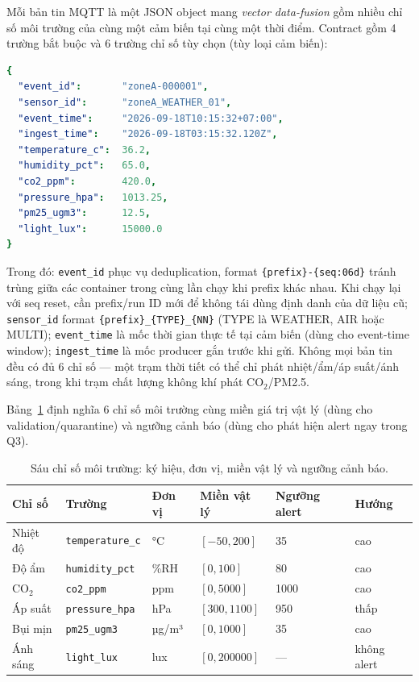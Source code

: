 Mỗi bản tin MQTT là một JSON object mang \emph{vector data-fusion} gồm nhiều
chỉ số môi trường của cùng một cảm biến tại cùng một thời điểm. Contract gồm
4 trường bắt buộc và 6 trường chỉ số tùy chọn (tùy loại cảm biến):

\begin{lstlisting}[language=yaml,basicstyle=\ttfamily\footnotesize,frame=single,
  caption={Sensor event schema (JSON) voi vector da chi so.},label={lst:schema}]
{
  "event_id":       "zoneA-000001",
  "sensor_id":      "zoneA_WEATHER_01",
  "event_time":     "2026-09-18T10:15:32+07:00",
  "ingest_time":    "2026-09-18T03:15:32.120Z",
  "temperature_c":  36.2,
  "humidity_pct":   65.0,
  "co2_ppm":        420.0,
  "pressure_hpa":   1013.25,
  "pm25_ugm3":      12.5,
  "light_lux":      15000.0
}
\end{lstlisting}

Trong đó: \texttt{event\_id} phục vụ deduplication, format
\texttt{\{prefix\}-\{seq:06d\}} tránh trùng giữa các container trong cùng
lần chạy khi prefix khác nhau. Khi chạy lại với seq reset, cần prefix/run ID
mới để không tái dùng định danh của dữ liệu cũ; \texttt{sensor\_id} format
\texttt{\{prefix\}\_\{TYPE\}\_\{NN\}} (TYPE là WEATHER, AIR hoặc MULTI); \texttt{event\_time} là mốc thời gian
thực tế tại cảm biến (dùng cho event-time window); \texttt{ingest\_time} là mốc
producer gắn trước khi gửi. Không mọi bản tin đều có đủ 6 chỉ số --- một trạm
thời tiết có thể chỉ phát nhiệt/ẩm/áp suất/ánh sáng, trong khi trạm chất lượng
không khí phát CO$_2$/PM2.5.

Bảng~\ref{tab:metrics} định nghĩa 6 chỉ số môi trường cùng miền giá trị vật lý
(dùng cho validation/quarantine) và ngưỡng cảnh báo (dùng cho phát hiện alert
ngay trong Q3).

\begin{table}[H]
\centering
\caption{Sáu chỉ số môi trường: ký hiệu, đơn vị, miền vật lý và ngưỡng cảnh báo.}
\label{tab:metrics}
\begin{tabularx}{\textwidth}{l l l l l X}
\toprule
\textbf{Chỉ số} & \textbf{Trường} & \textbf{Đơn vị} & \textbf{Miền vật lý} & \textbf{Ngưỡng alert} & \textbf{Hướng} \\
\midrule
Nhiệt độ & \texttt{temperature\_c} & °C & $[-50, 200]$ & 35 & cao \\
Độ ẩm & \texttt{humidity\_pct} & \%RH & $[0, 100]$ & 80 & cao \\
CO$_2$ & \texttt{co2\_ppm} & ppm & $[0, 5000]$ & 1000 & cao \\
Áp suất & \texttt{pressure\_hpa} & hPa & $[300, 1100]$ & 950 & thấp \\
Bụi mịn & \texttt{pm25\_ugm3} & µg/m³ & $[0, 1000]$ & 35 & cao \\
Ánh sáng & \texttt{light\_lux} & lux & $[0, 200000]$ & --- & không alert \\
\bottomrule
\end{tabularx}
\end{table}

